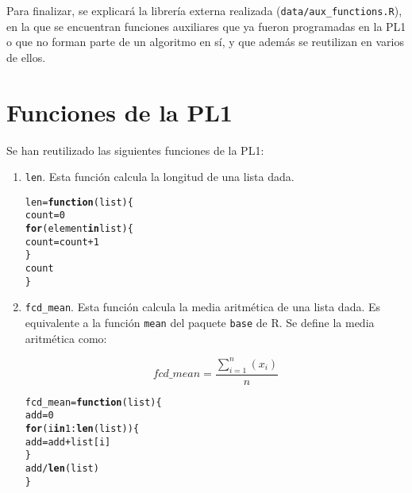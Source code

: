 \documentclass[12pt]{report}\usepackage[]{graphicx}\usepackage[dvipsnames]{xcolor}
\makeatletter
\newcommand{\hlnum}[1]{\textcolor[rgb]{0.686,0.059,0.569}{#1}}%
\newcommand{\hlopt}[1]{\textcolor[rgb]{0,0,0}{#1}}%
\newcommand{\hlstd}[1]{\textcolor[rgb]{0.345,0.345,0.345}{#1}}%
\newcommand{\hlkwa}[1]{\textcolor[rgb]{0.161,0.373,0.58}{\textbf{#1}}}%
\newcommand{\hlkwb}[1]{\textcolor[rgb]{0.69,0.353,0.396}{#1}}%
\newcommand{\hlkwc}[1]{\textcolor[rgb]{0.333,0.667,0.333}{#1}}%
\newcommand{\hlkwd}[1]{\textcolor[rgb]{0.737,0.353,0.396}{\textbf{#1}}}%
\newenvironment{kframe}{%
 \def\at@end@of@kframe{}%
 \ifinner\ifhmode%
  \def\at@end@of@kframe{\end{minipage}}%
  \begin{minipage}{\columnwidth}%
 \fi\fi%
 \def\FrameCommand##1{\hskip\@totalleftmargin \hskip-\fboxsep
 \colorbox{shadecolor}{##1}\hskip-\fboxsep
     \hskip-\linewidth \hskip-\@totalleftmargin \hskip\columnwidth}%
 \MakeFramed {\advance\hsize-\width
   \@totalleftmargin\z@ \linewidth\hsize
   \@setminipage}}%
 {\par\unskip\endMakeFramed%
 \at@end@of@kframe}
\newenvironment{knitrout}{}{} %
\makeatother
\begin{document}
	 	Para finalizar, se explicará la librería externa realizada (\texttt{data/aux\_functions.R}), en la que se encuentran funciones auxiliares que ya fueron programadas en la PL1 o que no forman parte de un algoritmo en sí, y que además se reutilizan en varios de ellos.
	 	
	 	\section{Funciones de la PL1}
	 	
	 	Se han reutilizado las siguientes funciones de la PL1:
	 	
	 	\begin{enumerate}
	 		\item \texttt{len}. Esta función calcula la longitud de una lista dada.
	 		
\begin{knitrout}
\color{fgcolor}\begin{kframe}
\begin{alltt}
\hlstd{len} \hlkwb{=} \hlkwa{function}\hlstd{(}\hlkwc{list}\hlstd{) \{}
        \hlstd{count} \hlkwb{=} \hlnum{0}
        \hlkwa{for} \hlstd{(element} \hlkwa{in} \hlstd{list) \{}
                \hlstd{count} \hlkwb{=} \hlstd{count} \hlopt{+} \hlnum{1}
        \hlstd{\}}
        \hlstd{count}
\hlstd{\}}
\end{alltt}
\end{kframe}
\end{knitrout}
 		
 		\item \texttt{fcd\_mean}. Esta función calcula la media aritmética de una lista dada. Es equivalente a la función \texttt{mean} del paquete \texttt{base} de R. Se define la media aritmética como:
 		
 		$$
 		fcd\_mean = \frac{\displaystyle\sum_{i=1}^n (x_i)}{n}
 		$$
 		
\begin{knitrout}
\color{fgcolor}\begin{kframe}
\begin{alltt}
\hlstd{fcd_mean} \hlkwb{=} \hlkwa{function}\hlstd{(}\hlkwc{list}\hlstd{) \{}
        \hlstd{add} \hlkwb{=} \hlnum{0}
        \hlkwa{for} \hlstd{(i} \hlkwa{in} \hlnum{1}\hlopt{:}\hlkwd{len}\hlstd{(list)) \{}
                \hlstd{add} \hlkwb{=} \hlstd{add} \hlopt{+} \hlstd{list[i]}
        \hlstd{\}}
        \hlstd{add} \hlopt{/} \hlkwd{len}\hlstd{(list)}
\hlstd{\}}
\end{alltt}
\end{kframe}
\end{knitrout}
 		

\end{enumerate}
\end{document}
